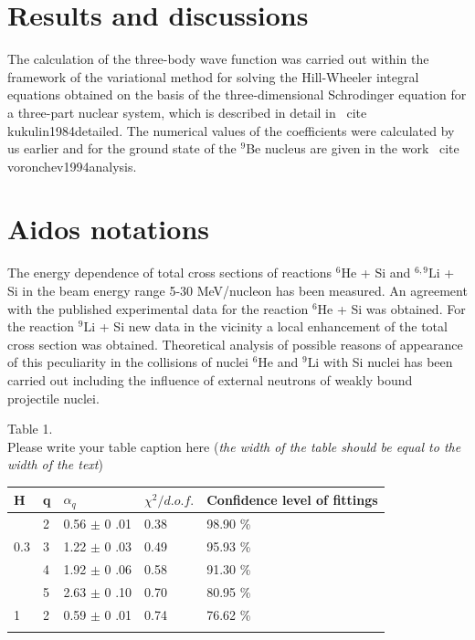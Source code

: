 \documentclass[12pt,a4paper,twoside]{article}
\begin{document}
\section*{Results and discussions}

The calculation of the three-body wave function was carried out within the framework of the variational method for solving the Hill-Wheeler integral equations obtained on the basis of the three-dimensional Schrodinger equation for a three-part nuclear system, which is described in detail in \ cite {kukulin1984detailed}.
The numerical values of the coefficients were calculated by us earlier and for the ground state of the $^9$Be nucleus are given in the work \ cite {voronchev1994analysis}.






\section{Aidos notations}







The energy dependence of total cross sections of reactions $^6\text{He}$ + Si and $^{6,9}\text{Li}$ + Si in the beam energy range 5-30 MeV/nucleon has been measured. An agreement with the published experimental data for the reaction $^6$He + Si was obtained. For the reaction $^9\text{Li}$ + Si new data in the vicinity a local enhancement of the total cross section was obtained. Theoretical analysis of possible reasons of appearance of this peculiarity in the collisions of nuclei $^6\text{He}$ and $^9\text{Li}$ with Si nuclei has been carried out including the influence of external neutrons of weakly bound projectile nuclei.
\\[0.3cm]

\begin{flushleft}
Table 1.\\
Please write your table caption here (\textit{the width of the table should be equal to the width of the text})\\
\begin{tabular}{p{1cm}|p{2.8cm}|p{3cm}|p{3cm}|p{3cm}}
\hline\noalign{\smallskip}
H&   q &  $\alpha_q$&   $\chi^{2}/d.o.f.$  & Confidence level of fittings\\ \hline\noalign{\smallskip}
 &2 &0.56 $\pm$  0 .01 & 0.38 & 98.90 \% \\ \cline{2-5}
0.3		&3 &1.22 $\pm$  0 .03 & 0.49 & 95.93 \% \\\cline{2-5}
		&4 &1.92 $\pm$  0 .06 & 0.58 & 91.30 \% \\\cline{2-5}
		&5 &2.63 $\pm$  0 .10 & 0.70 & 80.95 \% \\\hline\noalign{\smallskip}
1 	&2 &0.59 $\pm$  0 .01  &0.74 & 76.62 \% \\ \hline\noalign{\smallskip}
\end{tabular}\\[0.3cm]
\end{flushleft}
\end{document}
